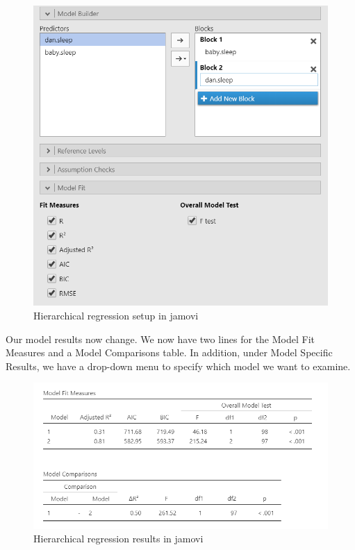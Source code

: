 \documentclass[
]{book}
\begin{document}
\begin{figure}

{\centering \includegraphics[width=1\linewidth]{images/13-regression/hierarchical-setup} 

}

\caption{Hierarchical regression setup in jamovi}\label{fig:unnamed-chunk-11}
\end{figure}

Our model results now change. We now have two lines for the Model Fit Measures and a Model Comparisons table. In addition, under Model Specific Results, we have a drop-down menu to specify which model we want to examine.

\begin{figure}

{\centering \includegraphics[width=1\linewidth]{images/13-regression/hierarchical-results} 

}

\caption{Hierarchical regression results in jamovi}\label{fig:unnamed-chunk-12}
\end{figure}
\end{document}
